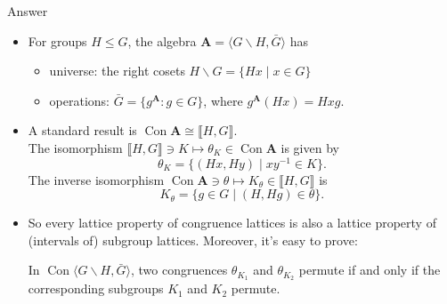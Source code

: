 \documentclass[xcolor=dvipsnames,9pt,hide notes,mathserif]{beamer}
\newcommand{\bs}{\ensuremath{\backslash}}
\newcommand{\Con}{\ensuremath{\operatorname{Con}}}
\renewcommand{\leq}{\ensuremath{\leqslant}}
\newcommand{\bA}{\ensuremath{\mathbf{A}}}
\newcommand{\lb}{\ensuremath{\llbracket}}
\newcommand{\rb}{\ensuremath{\rrbracket}}
\theoremstyle{definition}
\theoremstyle{remark}
\numberwithin{theorem}{section}
\numberwithin{claim}{section}
\numberwithin{equation}{section}
\numberwithin{conjecture}{section}
\newcommand{\<}{\ensuremath{\langle}}
\renewcommand{\>}{\ensuremath{\rangle}}
\begin{document}
\begin{frame}[label=gsets2]{Answer}
  \begin{itemize}
  \item For groups $H \leq G$, the algebra
$\bA = \<G\backslash H, \bar{G}\>$ has
\begin{itemize}
\item  universe: the right cosets $H\bs G = \{Hx \mid x\in G\}$ \\[4pt]
\item operations: $\bar{G} = \{g^{\bA} : g\in G\}$, where $g^{\bA}(Hx)=Hxg$.
\end{itemize}
\item<2->
A standard result is %
$\Con \bA \cong \lb H, G\rb$. %
\\[4pt]
The isomorphism $\lb H, G\rb \ni K \mapsto \theta_K \in \Con \bA$ is
  given by
\[
\theta_K = \{(Hx, Hy) \mid xy^{-1} \in K \}.
\]
The inverse isomorphism $\Con \bA \ni \theta \mapsto K_\theta \in \lb H, G\rb$ is
\[
K_\theta = \{ g\in G \mid (H, Hg) \in \theta \}.
\]
\item<3-> So every lattice property of congruence lattices
is also a lattice property of (intervals of) subgroup lattices.  
Moreover, it's easy to prove:
\begin{lemma}
  In $\Con \<G\bs H, \bar{G}\>$, two congruences $\theta_{K_1}$ and $\theta_{K_2}$
  permute if and only if the corresponding subgroups $K_1$ and $K_2$ permute.
\end{lemma}
  \end{itemize}
\end{frame}
\end{document}
